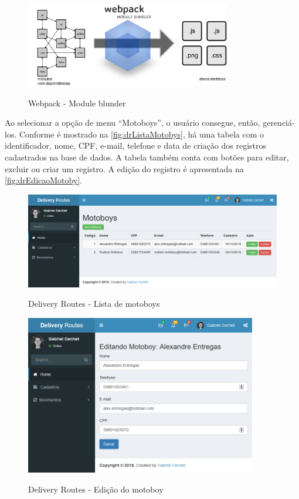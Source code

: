 \begin{figure}[H]
    \centering
    \caption{Webpack - Module blunder}
    \includegraphics[width=0.8\textwidth]{./dados/figuras/fig17}
    \label{fig:webpack}
\end{figure}

\newpage
Ao selecionar a opção de menu “Motoboys”, o usuário consegue, então, gerenciá-los. Conforme é mostrado na \autoref{fig:drListaMotobys}, há uma tabela com o identificador, nome, CPF, e-mail, telefone e data de criação dos registros cadastrados na base de dados. A tabela também conta com botões para editar, excluir ou criar um registro. A edição do registro é apresentada na \autoref{fig:drEdicaoMotoby}.

\begin{figure}[H]
    \centering
    \caption{Delivery Routes - Lista de motoboys}
    \includegraphics[width=1.0\textwidth]{./dados/figuras/fig18}
    \label{fig:drListaMotobys}
\end{figure}

\begin{figure}[H]
    \centering
    \caption{Delivery Routes - Edição do motoboy}
    \includegraphics[width=0.9\textwidth]{./dados/figuras/fig19}
    \label{fig:drEdicaoMotoby}
\end{figure}

